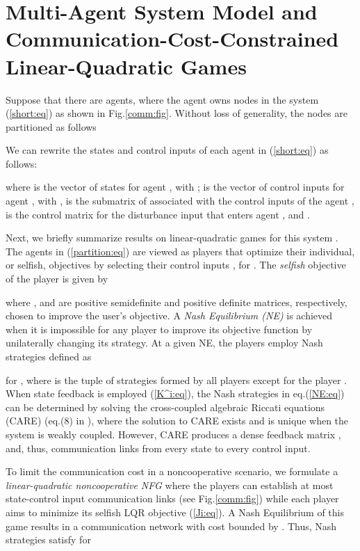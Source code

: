 \documentclass[12pt, draftclsnofoot,onecolumn]{IEEEtran}
\begin{document}
\section{Multi-Agent System Model and Communication-Cost-Constrained Linear-Quadratic Games}
\label{densegame:sec}
Suppose that there are  agents, where the agent  owns  nodes in the system (\ref{short:eq}) as shown in Fig.\ref{comm:fig}. Without loss of generality, the nodes are partitioned as follows

 

We can rewrite the states and control inputs of each agent  in (\ref{short:eq}) as follows:


\noindent where  is the vector of states for agent , with ;  is the vector of control inputs for agent , with ,  is the submatrix of  associated with the control inputs of the agent ,  is the control matrix for the disturbance input that enters agent , and .


Next, we briefly summarize results on linear-quadratic games for this system \cite{basar85,Mukaidani2006}. The agents in (\ref{partition:eq}) are viewed as players that optimize their individual, or selfish, objectives  by selecting their control inputs , for . The {\it selfish} objective of the player  is given by


\noindent where , and  are positive semidefinite and positive definite matrices, respectively, chosen to improve the  user's objective. A {\it Nash Equilibrium (NE)} is achieved when it is impossible for any player to improve its objective function by unilaterally changing its strategy. At a given NE, the players employ Nash strategies  defined as \cite{basar85}

\noindent for , where  is the tuple of strategies formed by all players except for the player . When state feedback is employed (\ref{K^i:eq}), the Nash strategies  in eq.(\ref{NE:eq}) can be determined by solving the cross-coupled algebraic Riccati equations (CARE) (eq.(8) in \cite{Mukaidani2006}), where the solution to CARE exists and is unique when the system is weakly coupled. However, CARE produces a dense feedback matrix \cite{Mukaidani2006}, and, thus, communication links from every state to every control input.

To limit the communication cost in a noncooperative scenario, we formulate a {\it linear-quadratic noncooperative NFG} where the players can establish at most  state-control input communication links (see Fig.\ref{comm:fig}) while each player aims to minimize its selfish LQR objective (\ref{Ji:eq}). A Nash Equilibrium of this game results in a communication network with cost bounded by . Thus, Nash strategies  satisfy for 
\end{document}
